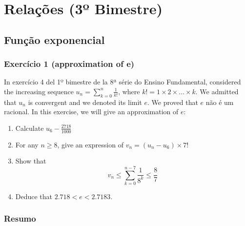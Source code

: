 \chapter{Relações (3º Bimestre)}

\section{Função exponencial}

\subsection*{Exercício 1 (approximation of e)}

In exercício 4 del 1º bimestre de la 8ª série do Ensino Fundamental,
considered the increasing sequence $u_n = \sum_{k=0}^{n} \frac{1}{k!}$, where
$k! = 1 \times 2 \times \dots \times k$.
We admitted that $u_n$ is convergent and we denoted its limit $e$. We proved
that $e$ não é um racional. In this exercise, we will give an approximation of
$e$:

\begin{enumerate}
\item Calculate $u_6 - \frac{2718}{1000}$
\item For any $n \geq 8$, give an expression of $v_n = (u_n - u_6) \times 7!$
\item Show that $$v_n \leq \sum_{k=0}^{n-7} \frac{1}{8^k} \leq \frac{8}{7}$$
\item Deduce that $2.718 < e < 2.7183$.
\end{enumerate}

\subsection*{Resumo}

